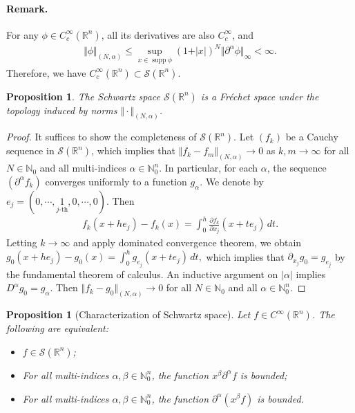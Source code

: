 \documentclass{article}
\numberwithin{equation}{section}
\newcommand{\bbN}{\mathbb{N}}
\newcommand{\bbR}{\mathbb{R}}
\renewcommand{\cal}{\mathcal}
\DeclareMathOperator{\supp}{supp}
\theoremstyle{plain}
\newtheorem{proposition}[theorem]{Proposition}
\theoremstyle{definition}
\begin{document}
\paragraph{Remark.} For any $\phi\in C^\infty_c(\bbR^n)$, all its derivatives are also $C_c^\infty$, and
\begin{align*}
	\Vert\phi\Vert_{(N,\alpha)}\leq \sup_{x\in\supp\phi}(1+\vert x\vert)^N\Vert \partial^\alpha\phi\Vert_\infty<\infty.
\end{align*}
Therefore, we have $C_c^\infty(\bbR^n)\subset\cal{S}(\bbR^n)$.

\begin{proposition}
The Schwartz space $\cal{S}(\bbR^n)$ is a Fréchet space under the topology induced by norms $\Vert\cdot\Vert_{(N,\alpha)}$.
\end{proposition}
\begin{proof}
It suffices to show the completeness of $\cal{S}(\bbR^n)$. Let $(f_k)$ be a Cauchy sequence in $\cal{S}(\bbR^n)$, which implies that $\Vert f_k-f_m\Vert_{(N,\alpha)}\to 0$ as $k,m\to\infty$ for all $N\in\bbN_0$ and all multi-indices $\alpha\in\bbN_0^n$. In particular, for each $\alpha$, the sequence $(\partial^\alpha f_k)$ converges uniformly to a function $g_\alpha$. We denote by $e_j=(0,\cdots,\underset{j\text{-th}}{1},0,\cdots,0)$. Then\vspace{-0.1cm}
\begin{align*}
	f_k(x+he_j)-f_k(x)=\int_0^h\frac{\partial f_k}{\partial x_j}(x+te_j)\,dt.
\end{align*}
Letting $k\to\infty$ and apply dominated convergence theorem, we obtain $g_0(x+he_j)-g_0(x)=\int_0^h g_{e_j}(x+te_j)\,dt,$
which implies that $\partial_{x_j}g_0=g_{e_j}$ by the fundamental theorem of calculus. An inductive argument on $\vert\alpha\vert$ implies $D^\alpha g_0=g_\alpha$. Then $\Vert f_k-g_0\Vert_{(N,\alpha)}\to 0$ for all $N\in\bbN_0$ and all $\alpha\in\bbN_0^n$.
\end{proof}
\begin{proposition}[Characterization of Schwartz space]\label{charschwartz}
Let $f\in C^\infty(\bbR^n)$. The following are equivalent:
\begin{itemize}
\item[(i)] $f\in\cal{S}(\bbR^n)$;
\item[(ii)] For all multi-indices $\alpha,\beta\in\bbN_0^n$, the function $x^\beta \partial^\alpha f$ is bounded;
\item[(iii)] For all multi-indices $\alpha,\beta\in\bbN_0^n$, the function $\partial^\alpha(x^\beta f)$ is bounded.
\end{itemize}
\end{proposition}
\end{document}
